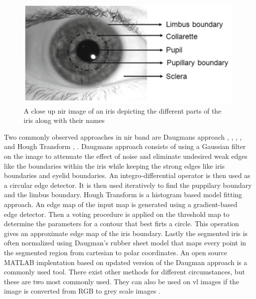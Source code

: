 \begin{figure}[htb]
\centering
\includegraphics[width=\textwidth]{figures/iris_naming.png} 
\caption{A close up \gls{nir} image of an iris depicting the different parts of the iris along with their names \citep{Bowyer2016b}}
\label{fig:iris_naming}
\end{figure}

Two commonly observed approaches in \gls{nir} band are Daugmans approach \citep{Daugman1993} , \citep{Saha2017}, \citep{Rattani2017}, \citep{Khan2017}, and Hough Transform \citep{Luhadiya2017}, \citep{Uka2017}. Daugmans approach consists of using a Gaussian filter on the image to attenuate the effect of noise and eliminate undesired weak edges like the boundaries within the iris while keeping the strong edges like iris boundaries and eyelid boundaries. An integro-differential operator is then used as a circular edge detector. It is then used iteratively to find the puppilary boundary and the limbus boundary. Hough Transform  is a histogram based model fitting approach. An edge map of the input map is generated using a gradient-based edge detector. Then a voting procedure is applied on the threshold map to determine the parameters for a contour that best firts a circle. This  operation gives an approximate edge map of the iris boundary. Lastly the segmented iris is often normalized  using  Daugman's rubber sheet model that maps every point in the segmented region from cartesian to polar coordinates. An open source MATLAB implentation based on updated version of the Daugman approach is a commonly used tool. There exist other methods for different circumstances, but these are two most commonly used. They can also be used on \gls{vl} images if the image is converted from RGB to grey scale images \cite{Bowyer2016b} . 

